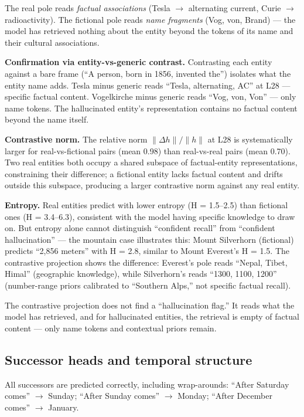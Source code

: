 \documentclass[11pt]{article}
\newcommand{\dhh}{\Delta h}
\begin{document}
The real pole reads \emph{factual associations} (Tesla $\rightarrow$ alternating current,
Curie $\rightarrow$ radioactivity). The fictional pole reads \emph{name fragments} (Vog, von,
Brand) --- the model has retrieved nothing about the entity beyond the tokens
of its name and their cultural associations.

\textbf{Confirmation via entity-vs-generic contrast.} Contrasting each entity
against a bare frame (``A person, born in 1856, invented the'') isolates what
the entity name adds. Tesla minus generic reads ``Tesla, alternating, AC'' at
L28 --- specific factual content. Vogelkirche minus generic reads ``Vog, von,
Von'' --- only name tokens. The hallucinated entity's representation contains
no factual content beyond the name itself.

\textbf{Contrastive norm.} The relative norm $\|\dhh\|/\|h\|$ at L28 is systematically
larger for real-vs-fictional pairs (mean 0.98) than real-vs-real pairs (mean
0.70). Two real entities both occupy a shared subspace of factual-entity
representations, constraining their difference; a fictional entity lacks
factual content and drifts outside this subspace, producing a larger
contrastive norm against any real entity.

\textbf{Entropy.} Real entities predict with lower entropy (H = 1.5--2.5) than
fictional ones (H = 3.4--6.3), consistent with the model having specific
knowledge to draw on. But entropy alone cannot distinguish ``confident recall''
from ``confident hallucination'' --- the mountain case illustrates this: Mount
Silverhorn (fictional) predicts ``2,856 meters'' with H = 2.8, similar to
Mount Everest's H = 1.5. The contrastive projection shows the difference:
Everest's pole reads ``Nepal, Tibet, Himal'' (geographic knowledge), while
Silverhorn's reads ``1300, 1100, 1200'' (number-range priors calibrated to
``Southern Alps,'' not specific factual recall).

The contrastive projection does not find a ``hallucination flag.'' It reads
what the model has retrieved, and for hallucinated entities, the retrieval is
empty of factual content --- only name tokens and contextual priors remain.

\subsection{Successor heads and temporal structure}

All successors are predicted correctly, including wrap-arounds:
``After Saturday comes'' $\rightarrow$ Sunday; ``After Sunday comes'' $\rightarrow$ Monday;
``After December comes'' $\rightarrow$ January.
\end{document}
